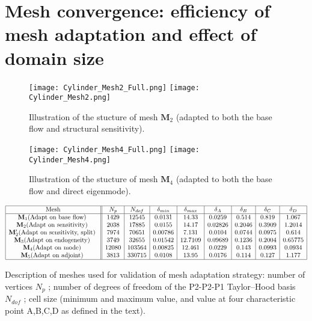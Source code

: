 \documentclass[twocolumn,10pt]{asme2ej}
\begin{document}
\section{Mesh convergence: efficiency of mesh adaptation and effect of domain size}
\begin{figure}
\texttt{[image: Cylinder\_Mesh2\_Full.png]}
\texttt{[image: Cylinder\_Mesh2.png]}
\caption{Illustration of the stucture of mesh  $\mathbf{M}_2$ (adapted to both the base flow and structural sensitivity).}
\label{fig:mesh2}
\end{figure}

\begin{figure}
\texttt{[image: Cylinder\_Mesh4\_Full.png]}
\texttt{[image: Cylinder\_Mesh4.png]}
\caption{Illustration of the stucture of mesh  $\mathbf{M}_4$ (adapted to both the base flow and direct eigenmode).}
\label{fig:mesh4}
\end{figure}



\begin{table*}
$$
\begin{array}{|c||c|c|c|c|c|c|c|c|c|}
\hline
\mbox{Mesh} & N_p & N_{dof} & \delta_{min} & \delta_{max} & \delta_A  & \delta_B  & \delta_C  & \delta_D  \\
\hline
\mathbf{M}_1 \mbox{(Adapt on base flow) } & 1429 & 12545	& 0.0131 & 14.33 		& 0.0259 	& 0.514 	& 0.819 	& 1.067 \\   
\mathbf{M}_2 \mbox{(Adapt on sensitivity) } & 2038 & 17885	& 0.0155 & 14.17 		& 0.02826 & 0.2046 	& 0.3909 	& 1.2014 	\\
\mathbf{M}_2' \mbox{(Adapt on sensitivity, split) } & 7974 & 70651	& 0.00786 & 7.131  		& 0.0104 	& 0.0744 	&   0.0975 & 0.614   \\
\mathbf{M}_3 \mbox{(Adapt on endogeneity) } & 3749 & 32655	& 0.01542 & 12.7109  		& 0.09689 	& 0.1236 	&   0.2004 & 0.65775   \\
\mathbf{M}_4 \mbox{(Adapt on mode) } 	& 12080  & 103564		&0.00825	& 12.461		& 0.0229	& 0.143	& 0.0993	& 0.0934 \\
\mathbf{M}_5 \mbox{(Adapt on adjoint) } 	& 3813 	& 330715		& 0.0108	& 13.95		& 0.0176 	& 0.114	& 0.127	& 1.177  \\
\hline
\end{array}
$$
\caption{Description of meshes used for validation of mesh adaptation strategy: number of vertices $N_p$ ; number of degrees of freedom of the P2-P2-P1 Taylor--Hood basis $N_{dof}$ ; cell size (minimum and maximum value, and value at four characteristic point A,B,C,D as defined in the text). 
 }
\label{tab:conv1}
\end{table*}
\end{document}
